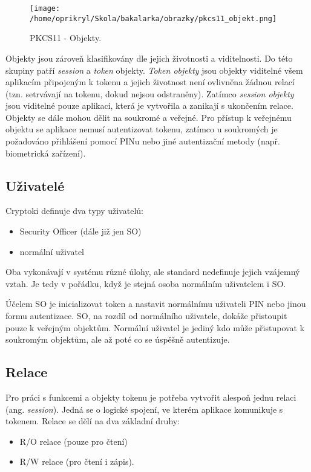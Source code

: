 \documentclass[]{fithesis3}
\begin{document}
		\begin{figure}[!ht]
  			\begin{minipage}{1.00\textwidth}
    				\texttt{[image: /home/oprikryl/Skola/bakalarka/obrazky/pkcs11\_objekt.png]}
  			\end{minipage}
 			\caption{PKCS11 - Objekty.}
  			\label{fig:PKCS11 - Objekty.}
		\end{figure}

		Objekty jsou zároveň klasifikovány dle jejich životnosti a viditelnosti. Do této skupiny patří 			\textit{session} a \textit{token} objekty. \textit{Token objekty} jsou objekty viditelné všem 			aplikacím připojeným k tokenu a jejich životnost není ovlivněna žádnou relací (tzn. 					setrvávají na tokenu, dokud nejsou odstraněny). Zatímco \textit{session objekty} jsou 				viditelné pouze aplikaci, která je vytvořila a zanikají s ukončením relace.
		Objekty se dále mohou dělit na soukromé a veřejné. Pro přístup k veřejnému objektu se 			aplikace nemusí autentizovat tokenu, zatímco u soukromých je požadováno přihlášení 				pomocí PINu nebo jiné autentizační metody (např. biometrická zařízení).

		\newpage
		\subsection{Uživatelé}

		Cryptoki definuje dva typy uživatelů: 
		\begin{itemize}
			\item Security Officer (dále již jen SO) 
			\item normální uživatel
		\end{itemize}
		Oba vykonávají v systému různé úlohy, ale standard nedefinuje jejich vzájemný vztah. Je 			tedy v pořádku, když je stejná osoba normálním uživatelem i SO.

		Účelem SO je inicializovat token a nastavit normálnímu uživateli PIN nebo jinou formu 				autentizace. SO, na rozdíl od normálního uživatele, dokáže přistoupit pouze k veřejným 			objektům.
		Normální uživatel je jediný kdo může přistupovat k soukromým objektům, ale až poté co	
		se úspěšně autentizuje. 

		\subsection{Relace}

		Pro práci s funkcemi a objekty tokenu je potřeba vytvořit alespoň jednu relaci (ang. 				\textit{session}). Jedná se o logické spojení, ve kterém aplikace komunikuje s tokenem. 			Relace se dělí na dva základní druhy:
		\begin{itemize}
			\item R/O relace (pouze pro čtení) 
			\item R/W relace (pro čtení i zápis).
		\end{itemize}
\end{document}
